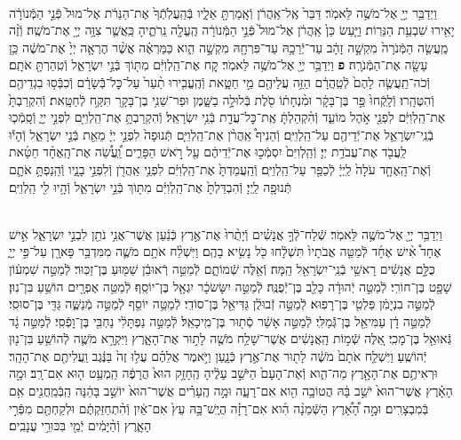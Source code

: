 \documentclass[twoside, openany, parskip=half, 11pt]{book}
\begin{document}
\begin{footnotesize}
\begin{multicols}{2}
\\
וַיְדַבֵּ֥ר יְיָ֖ אֶל־מֹשֶׁ֥ה לֵּאמֹֽר׃ דַּבֵּר֙ אֶֽל־אַֽהֲרֹ֔ן וְֿאָֽמַרְתָּ֖ אֵלָ֑יו בְּֿהַֽעֲלֹֽתְֿךָ֙ אֶת־הַנֵּרֹ֔ת אֶל־מוּל֙ פְּֿנֵ֣י הַמְּֿנוֹרָ֔ה יָאִ֖ירוּ שִׁבְעַ֥ת הַנֵּרֽוֹת׃ וַיַּ֤עַשׂ כֵּן֙ אַֽהֲרֹ֔ן אֶל־מוּל֙ פְּֿנֵ֣י הַמְּֿנוֹרָ֔ה הֶֽעֱלָ֖ה נֵֽרֹתֶ֑יהָ כַּֽאֲשֶׁ֛ר צִוָּ֥ה יְיָ֖ אֶת־מֹשֶֽׁה׃ וְֿזֶ֨ה מַֽעֲשֵׂ֤ה הַמְּֿנֹרָה֙ מִקְשָׁ֣ה זָהָ֔ב עַד־יְֿרֵכָ֥הּ עַד־פִּרְחָ֖הּ מִקְשָׁ֣ה הִ֑וא כַּמַּרְאֶ֗ה אֲשֶׁ֨ר הֶרְאָ֤ה יְיָ֙ אֶת־מֹשֶׁ֔ה כֵּ֥ן עָשָׂ֖ה אֶת־הַמְּֿנֹרָֽה׃ \textbf{פ}
וַיְדַבֵּ֥ר יְיָ֖ אֶל־מֹשֶׁ֥ה לֵּאמֹֽר׃ קַ֚ח אֶת־הַֽלְוִיִּ֔ם מִתּ֖וֹךְ בְּֿנֵ֣י יִשְׂרָאֵ֑ל וְֿטִֽהַרְתָּ֖ אֹתָֽם׃ וְֿכֹה־תַֽעֲשֶׂ֤ה לָהֶם֙ לְֿטַֽהֲרָ֔ם הַזֵּ֥ה עֲלֵיהֶ֖ם מֵ֣י חַטָּ֑את וְֿהֶֽעֱבִ֤ירוּ תַ֨עַר֙ עַל־כׇּל־בְּֿֿשָׂרָ֔ם וְֿכִבְּֿס֥וּ בִגְדֵיהֶ֖ם וְֿהִטֶּהָֽרוּ׃ וְֿלָֽקְֿחוּ֙ פַּ֣ר בֶּן־בָּקָ֔ר וּמִ֨נְחָת֔וֹ סֹ֖לֶת בְּֿלוּלָ֣ה בַשָּׁ֑מֶן וּפַר־שֵׁנִ֥י בֶן־בָּקָ֖ר תִּקַּ֥ח לְֿחַטָּֽאת׃ וְֿהִקְרַבְתָּ֙ אֶת־הַֽלְוִיִּ֔ם לִפְנֵ֖י אֹ֣הֶל מוֹעֵ֑ד וְֿהִ֨קְהַלְתָּ֔ אֶֽת־כׇּל־עֲדַ֖ת בְּֿנֵ֥י יִשְׂרָאֵֽל׃  וְֿהִקְרַבְתָּ֥ אֶת־הַֽלְוִיִּ֖ם לִפְנֵ֣י יְיָ֑ וְֿסָֽמְֿכ֧וּ בְֿנֵֽי־יִשְׂרָאֵ֛ל אֶת־יְֿדֵיהֶ֖ם עַל־הַֽלְוִיִּֽם׃ וְֿהֵנִיף֩ אַֽהֲרֹ֨ן אֶת־הַֽלְוִיִּ֤ם תְּֿנוּפָה֙ לִפְנֵ֣י יְיָ֔ מֵאֵ֖ת בְּֿנֵ֣י יִשְׂרָאֵ֑ל וְֿהָי֕וּ לַֽעֲבֹ֖ד אֶת־עֲבֹדַ֥ת יְיָ׃ וְֿהַֽלְוִיִּם֙ יִסְמְֿכ֣וּ אֶת־יְֿדֵיהֶ֔ם עַ֖ל רֹ֣אשׁ הַפָּרִ֑ים וַֽ֠עֲשֵׂ֠ה אֶת־הָֽאֶחָ֨ד חַטָּ֜את וְֿאֶת־הָֽאֶחָ֤ד עֹלָה֙ לַֽיְיָ֔ לְֿכַפֵּ֖ר עַל־הַֽלְוִיִּֽם׃ וְֿהַֽעֲמַדְתָּ֙ אֶת־הַֽלְוִיִּ֔ם לִפְנֵ֥י אַֽהֲרֹ֖ן וְֿלִפְנֵ֣י בָנָ֑יו וְֿהֵֽנַפְתָּ֥ אֹתָ֛ם תְּֿנוּפָ֖ה לַֽיְיָ׃ וְֿהִבְדַּלְתָּ֙ אֶת־הַֽלְוִיִּ֔ם מִתּ֖וֹךְ בְּֿנֵ֣י יִשְׂרָאֵ֑ל וְֿהָ֥יוּ לִ֖י הַֽלְוִיִּֽם׃

\\
וַיְדַבֵּ֥ר יְיָ֖ אֶל־מֹשֶׁ֥ה לֵּאמֹֽר׃ שְֿׁלַח־לְֿךָ֣ אֲנָשִׁ֗ים וְֿיָתֻ֨רוּ֙ אֶת־אֶ֣רֶץ כְּֿנַ֔עַן אֲשֶׁר־אֲנִ֥י נֹתֵ֖ן לִבְנֵ֣י יִשְׂרָאֵ֑ל אִ֣ישׁ אֶחָד֩ אִ֨ישׁ אֶחָ֜ד לְֿמַטֵּ֤ה אֲבֹתָיו֙ תִּשְׁלָ֔חוּ כֹּ֖ל נָשִׂ֥יא בָהֶֽם׃ וַיִּשְׁלַ֨ח אֹתָ֥ם מֹשֶׁ֛ה מִמִּדְבַּ֥ר פָּארָ֖ן עַל־פִּ֣י יְיָ֑ כֻּלָּ֣ם אֲנָשִׁ֔ים רָאשֵׁ֥י בְֿנֵֽי־יִשְׂרָאֵ֖ל הֵֽמָּה׃  וְֿאֵ֖לֶּה שְֿׁמוֹתָ֑ם לְֿמַטֵּ֣ה רְֿאוּבֵ֔ן שַׁמּ֖וּעַ בֶּן־זַכּֽוּר׃ לְֿמַטֵּ֣ה שִׁמְע֔וֹן שָׁפָ֖ט בֶּן־חוֹרִֽי׃ לְֿמַטֵּ֣ה יְֿהוּדָ֔ה כָּלֵ֖ב בֶּן־יְֿפֻנֶּֽה׃ לְֿמַטֵּ֣ה יִשָּׂשׂכָ֔ר יִגְאָ֖ל בֶּן־יוֹסֵֽף׃ לְֿמַטֵּ֥ה אֶפְרָ֖יִם הוֹשֵׁ֥עַ בִּן־נֽוּן׃ לְֿמַטֵּ֣ה בִנְיָמִ֔ן פַּלְטִ֖י בֶּן־רָפֽוּא׃ לְֿמַטֵּ֣ה זְֿבוּלֻ֔ן גַּדִּיאֵ֖ל בֶּן־סוֹדִֽי׃ לְֿמַטֵּ֥ה יוֹסֵ֖ף לְֿמַטֵּ֣ה מְֿנַשֶּׁ֑ה גַּדִּ֖י בֶּן־סוּסִֽי׃ לְֿמַטֵּ֣ה דָ֔ן עַמִּיאֵ֖ל בֶּן־גְּֿֿמַלִּֽי׃ לְֿמַטֵּ֣ה אָשֵׁ֔ר סְֿת֖וּר בֶּן־מִֽיכָאֵֽל׃ לְֿמַטֵּ֣ה נַפְתָּלִ֔י נַחְבִּ֖י בֶּן־וָפְֿסִֽי׃ לְֿמַטֵּ֣ה גָ֔ד גְּֿאוּאֵ֖ל בֶּן־מָכִֽי׃ אֵ֚לֶּה שְֿׁמ֣וֹת הָֽאֲנָשִׁ֔ים אֲשֶׁר־שָׁלַ֥ח מֹשֶׁ֖ה לָת֣וּר אֶת־הָאָ֑רֶץ וַיִּקְרָ֥א מֹשֶׁ֛ה לְֿהוֹשֵׁ֥עַ בִּן־נ֖וּן יְֿהוֹשֻֽׁעַ׃  וַיִּשְׁלַ֤ח אֹתָם֙ מֹשֶׁ֔ה לָת֖וּר אֶת־אֶ֣רֶץ כְּֿנָ֑עַן וַיֹּ֣אמֶר אֲלֵהֶ֗ם עֲל֥וּ זֶה֙ בַּנֶּ֔גֶב וַֽעֲלִיתֶ֖ם אֶת־הָהָֽר׃ וּרְאִיתֶ֥ם אֶת־הָאָ֖רֶץ מַה־הִ֑וא וְֿאֶת־הָעָם֙ הַיֹּשֵׁ֣ב עָלֶ֔יהָ הֶֽחָזָ֥ק הוּא֙ הֲרָפֶ֔ה הַֽמְעַ֥ט ה֖וּא אִם־רָֽב׃ וּמָ֣ה הָאָ֗רֶץ אֲשֶׁר־הוּא֙ יֹשֵׁ֣ב בָּ֔הּ הֲטוֹבָ֥ה הִ֖וא אִם־רָעָ֑ה וּמָ֣ה הֶֽעָרִ֗ים אֲשֶׁר־הוּא֙ יוֹשֵׁ֣ב בָּהֵ֔נָּה הַֽבְּֿמַֽחֲנִ֖ים אִ֥ם בְּֿמִבְצָרִֽים׃ וּמָ֣ה הָ֠אָ֠רֶץ הַשְּֿׁמֵנָ֨ה הִ֜וא אִם־רָזָ֗ה הֲיֶֽשׁ־בָּ֥הּ עֵץ֙ אִם־אַ֔יִן וְֿהִ֨תְחַזַּקְתֶּ֔ם וּלְקַחְתֶּ֖ם מִפְּֿרִ֣י הָאָ֑רֶץ וְֿהַ֨יָּמִ֔ים יְֿמֵ֖י בִּכּוּרֵ֥י עֲנָבִֽים׃


\end{multicols}
\end{footnotesize}
\end{document}
